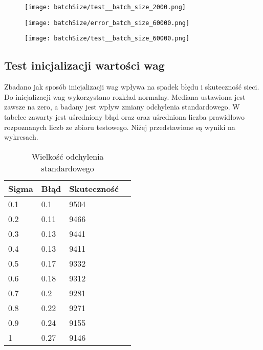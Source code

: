\documentclass{article}
\begin{document}
\begin{figure}[]
  \centering
  \texttt{[image: batchSize/test\_\_batch\_size\_2000.png]}
\end{figure}

\begin{figure}[]
  \centering
  \texttt{[image: batchSize/error\_batch\_size\_60000.png]}
\end{figure}

\begin{figure}[]
  \centering
  \texttt{[image: batchSize/test\_\_batch\_size\_60000.png]}
\end{figure}

\newpage
\subsection{Test inicjalizacji wartości wag}

Zbadano jak sposób inicjalizacji wag wpływa na spadek błędu i skuteczność sieci. Do inicjalizacji wag wykorzystano rozkład normalny.
Mediana ustawiona jest zawsze na zero, a badany jest wpływ zmiany odchylenia standardowego. 
W tabelce zawarty jest uśredniony błąd oraz oraz uśredniona liczba prawidłowo rozpoznanych
liczb ze zbioru testowego. Niżej przedstawione są wyniki na wykresach.

\begin{table}[h]
  \centering
    
  \bgroup
  \def\arraystretch{1.3}
  \begin{tabular}{|l|l|l|l|}
  \hline
  Sigma & Błąd & Skuteczność \\ \hline
  0.1 & 0.1 & 9504 \\ \hline
  0.2 & 0.11 & 9466 \\ \hline
  0.3 & 0.13 & 9441 \\ \hline
  0.4 & 0.13 & 9411 \\ \hline
  0.5 & 0.17 & 9332 \\ \hline
  0.6 & 0.18 & 9312 \\ \hline
  0.7 & 0.2 & 9281 \\ \hline
  0.8 & 0.22 & 9271 \\ \hline
  0.9 & 0.24 & 9155 \\ \hline
  1 & 0.27 & 9146 \\ \hline
  \end{tabular}
  \egroup
  \vspace{10pt}
  \caption{Wielkość odchylenia standardowego}
\end{table}
\end{document}

